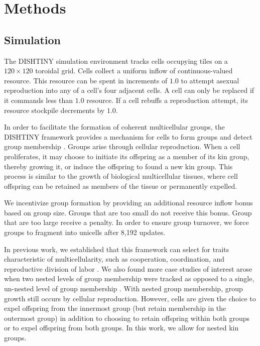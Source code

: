 \section{Methods}

\subsection{Simulation}

The DISHTINY simulation environment tracks cells occupying tiles on a $120\times120$ toroidal grid.
Cells collect a uniform inflow of continuous-valued resource.
This resource can be spent in increments of $1.0$ to attempt asexual reproduction into any of a cell's four adjacent cells.
A cell can only be replaced if it commands less than $1.0$ resource.
If a cell rebuffs a reproduction attempt, its resource stockpile decrements by $1.0$.  

In order to facilitate the formation of coherent multicellular groups, the DISHTINY framework provides a mechanism for cells to form groups and detect group membership \citep{moreno2019toward}.
Groups arise through cellular reproduction.
When a cell proliferates, it may choose to initiate its offspring as a member of its kin group, thereby growing it, or induce the offspring to found a new kin group.
This process is similar to the growth of biological multicellular tissues, where cell offspring can be retained as members of the tissue or permanently expelled.

We incentivize group formation by providing an additional resource inflow bonus based on group size.
Groups that are too small do not receive this bonus.
Group that are too large receive a penalty.
In order to ensure group turnover, we force groups to fragment into unicells after 8,192 updates.


In previous work, we established that this framework can select for traits characteristic of multicellularity, such as cooperation, coordination, and reproductive division of labor \cite{moreno2021exploring}.
We also found more case studies of interest arose when two nested levels of group membership were tracked
as opposed to a single, un-nested level of group membership \cite{moreno2021exploring}.
With nested group membership, group growth still occurs by cellular reproduction.
However, cells are given the choice to expel offspring from the innermost group (but retain membership in the outermost group) in addition to choosing to retain offspring within both groups or to expel offspring from both groups.
In this work, we allow for nested kin groups.

